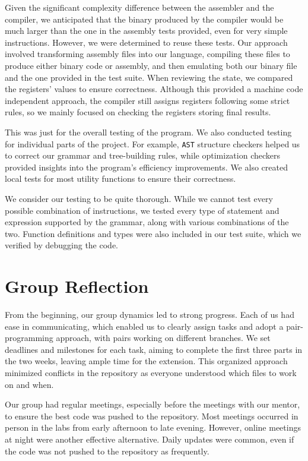 \documentclass{article}
\begin{document}
Given the significant complexity difference between the assembler and the compiler, we anticipated that the binary produced by the compiler would be much larger than the one in the assembly tests provided, even for very simple instructions. However, we were determined to reuse these tests. Our approach involved transforming assembly files into our language, compiling these files to produce either binary code or assembly, and then emulating both our binary file and the one provided in the test suite. When reviewing the state, we compared the registers' values to ensure correctness. Although this provided a machine code independent approach, the compiler still assigns registers following some strict rules, so we mainly focused on checking the registers storing final results.

This was just for the overall testing of the program. We also conducted testing for individual parts of the project. For example, \texttt{AST} structure checkers helped us to correct our grammar and tree-building rules, while optimization checkers provided insights into the program's efficiency improvements. We also created local tests for most utility functions to ensure their correctness.

We consider our testing to be quite thorough. While we cannot test every possible combination of instructions, we tested every type of statement and expression supported by the grammar, along with various combinations of the two. Function definitions and types were also included in our test suite, which we verified by debugging the code.

\section{Group Reflection}

From the beginning, our group dynamics led to strong progress. Each of us had ease in communicating, which enabled us to clearly assign tasks and adopt a pair-programming approach, with pairs working on different branches. We set deadlines and milestones for each task, aiming to complete the first three parts in the two weeks, leaving ample time for the extension. This organized approach minimized conflicts in the repository as everyone understood which files to work on and when.

Our group had regular meetings, especially before the meetings with our mentor, to ensure the best code was pushed to the repository. Most meetings occurred in person in the labs from early afternoon to late evening. However, online meetings at night were another effective alternative. Daily updates were common, even if the code was not pushed to the repository as frequently.
\end{document}
